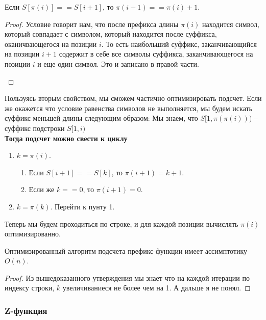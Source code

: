 \begin{prop}
	Если $S[\pi(i)] == S[i + 1]$, то  $\pi(i + 1) == \pi(i) + 1$.
\end{prop}
\begin{proof}
	Условие говорит нам, что после префикса длины $\pi(i)$ находится символ, который совпадает с символом, который находится после суффикса, оканичвающегося на позиции $i$. То есть наибольший суффикс, заканчивающийся на позиции $i + 1$ содержит в себе все символы суффикса, заканчивающегося на позиции $i$ и еще один символ. Это и записано в правой части.
	\begin{center}
	\end{center}
\end{proof}

Пользуясь вторым свойством, мы сможем частично оптимизировать подсчет. Если же окажется что условие равенства символов не выполняется, мы будем искать суффикс меньшей длины следующим образом:
Мы знаем, что $S[1, \pi(\pi(i)))$ -- суффикс подстроки  $S[1, i)$ \\

\textbf{Тогда подсчет можно свести к циклу}
\begin{enumerate}
\setcounter{enumi}{0}
	\item $k = \pi(i)$.
	\begin{enumerate}
		\item Если $S[i + 1] == S[k]$, то $\pi(i + 1) = k + 1$.
		\item Если же $k == 0$, то $\pi(i + 1) = 0$.
	\end{enumerate}
	\item $k = \pi(k)$. Перейти к пунту 1.
\end{enumerate}

Теперь мы будем проходиться по строке, и для каждой позиции вычислять $\pi(i)$ оптимизированно.

\begin{prop}
	Оптимизированный алгоритм подсчета префикс-функции имеет ассимптотику $O(n)$.	
\end{prop}
\begin{proof}
	Из вышедоказанного утверждения мы знает что на каждой итерации по индексу строки, $k$ увеличиваниеся не более чем на 1.
	А дальше я не понял.
\end{proof}

\subsubsection{Z-функция}


